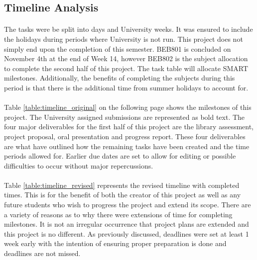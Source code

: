 \newpage


\subsection{Timeline Analysis} \label{appendix:Timeline}

\paragraph{}
The tasks were be split into days and University weeks. It was ensured to include the holidays during periods where University is not run. This project does not simply end upon the completion of this semester. BEB801 is concluded on November 4th at the end of Week 14, however BEB802 is the subject allocation to complete the second half of this project. The task table will allocate SMART milestones. Additionally, the benefits of completing the subjects during this period is that there is the additional time from summer holidays to account for.

\paragraph{}
Table \ref{table:timeline_original} on the following page shows the milestones of this project. The University assigned submissions are represented as bold text. The four major deliverables for the first half of this project are the library assessment, project proposal, oral presentation and progress report. These four deliverables are what have outlined how the remaining tasks have been created and the time periods allowed for. Earlier due dates are set to allow for editing or possible difficulties to occur without major repercussions. 

\paragraph{}
Table \ref{table:timeline_revised} represents the revised timeline with completed times. This is for the benefit of both the creator of this project as well as any future students who wish to progress the project and extend its scope. There are a variety of reasons as to why there were extensions of time for completing milestones. It is not an irregular occurrence that project plans are extended and this project is no different. As previously discussed, deadlines were set at least 1 week early with the intention of ensuring proper preparation is done and deadlines are not missed.     

